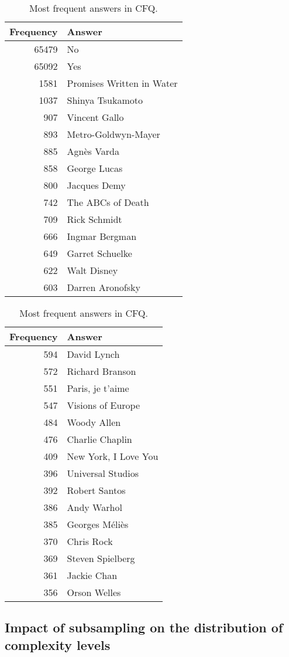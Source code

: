 \documentclass[letterpaper]{article}
\begin{document}
\begin{table}[tb]
    \caption{Most frequent answers in CFQ.}
    \centering \small
    \begin{tabular}{@{}rl@{}}
\hline
        Frequency &  Answer \\
\hline\hline 
65479	& No\\
65092	& Yes\\
1581	& Promises Written in Water\\
1037	& Shinya Tsukamoto\\
907	& Vincent Gallo\\
893	& Metro-Goldwyn-Mayer\\
885	& Agn\`es Varda\\
858	& George Lucas\\
800	& Jacques Demy\\
742	& The ABCs of Death\\
709	& Rick Schmidt\\
666	& Ingmar Bergman\\
649	& Garret Schuelke\\
622	& Walt Disney\\
603	& Darren Aronofsky\\
\hline
    \end{tabular}\qquad
    \begin{tabular}{@{}rl@{}}
\hline
        Frequency &  Answer \\
\hline\hline 
594	& David Lynch\\
572	& Richard Branson\\
551	& Paris, je t'aime\\
547	& Visions of Europe\\
484	& Woody Allen\\
476	& Charlie Chaplin\\
409	& New York, I Love You\\
396	& Universal Studios\\
392	& Robert Santos\\
386	& Andy Warhol\\
385	& Georges M\'eli\`es\\
370	& Chris Rock\\
369	& Steven Spielberg\\
361	& Jackie Chan\\
356	& Orson Welles\\
\hline
    \end{tabular}
    \label{tab:answer-frequency}
\end{table}

\subsection{Impact of subsampling on the distribution of complexity levels}
\end{document}
